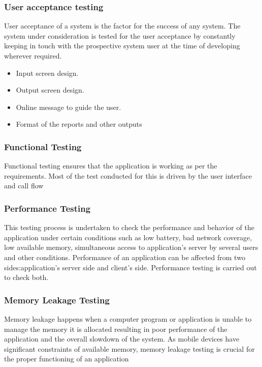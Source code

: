 \documentclass[BTech]{srmuthesis}
\begin{document}
\subsubsection{User acceptance testing}
User acceptance of a system is the factor for the success of any system. The system
under consideration is tested for the user acceptance by constantly keeping in touch
with the prospective system user at the time of developing wherever required.
\begin{itemize}
\item Input screen design.
\item Output screen design.
\item Online message to guide the user.
\item Format of the reports and other outputs
\end{itemize}
\subsubsection{Functional Testing}
Functional testing ensures that the application is working as per the requirements. Most of the test conducted for this is driven by the user interface and call flow
\subsubsection{Performance Testing}
This testing process is undertaken to check the performance and behavior of the application under certain conditions such as low battery, bad network coverage, low available memory, simultaneous access to application's server by several users and other conditions. Performance of an application can be affected from two sides:application's server side and client's side. Performance testing is carried out to check both.
\subsubsection{Memory Leakage Testing}
Memory leakage happens when a computer program or application is unable to manage the memory it is allocated resulting in poor performance of the application and the overall slowdown of the system. As mobile devices have significant constraints of available memory, memory leakage testing is crucial for the proper functioning of an application
\end{document}
